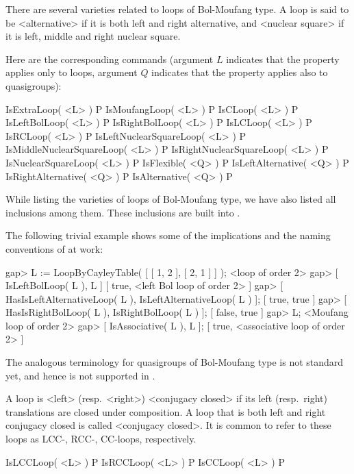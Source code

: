 There are several varieties related to loops of Bol-Moufang type. A loop is
said to be <alternative> if it is both left and
right alternative, and <nuclear square> if it is left,
middle and right nuclear square.

Here are the corresponding {\LOOPS} commands (argument $L$ indicates that the
property applies only to loops, argument $Q$ indicates that the property
applies also to quasigroups):

\>IsExtraLoop( <L> ) P
\>IsMoufangLoop( <L> ) P
\>IsCLoop( <L> ) P
\>IsLeftBolLoop( <L> ) P
\>IsRightBolLoop( <L> ) P
\>IsLCLoop( <L> ) P
\>IsRCLoop( <L> ) P
\>IsLeftNuclearSquareLoop( <L> ) P
\>IsMiddleNuclearSquareLoop( <L> ) P
\>IsRightNuclearSquareLoop( <L> ) P
\>IsNuclearSquareLoop( <L> ) P
\>IsFlexible( <Q> ) P
\>IsLeftAlternative( <Q> ) P
\>IsRightAlternative( <Q> ) P
\>IsAlternative( <Q> ) P

While listing the varieties of loops of Bol-Moufang type, we have also listed
all inclusions among them. These inclusions are built into {\LOOPS}.

The following trivial example shows some of the implications and the naming
conventions of {\LOOPS} at work:

\beginexample
gap> L := LoopByCayleyTable( [ [ 1, 2 ], [ 2, 1 ] ] );
<loop of order 2>
gap> [ IsLeftBolLoop( L ), L ]
[ true, <left Bol loop of order 2> ]
gap> [ HasIsLeftAlternativeLoop( L ), IsLeftAlternativeLoop( L ) ];
[ true, true ]
gap> [ HasIsRightBolLoop( L ), IsRightBolLoop( L ) ];
[ false, true ]
gap> L;
<Moufang loop of order 2>
gap> [ IsAssociative( L ), L ];
[ true, <associative loop of order 2> ]
\endexample

The analogous terminology for quasigroups of Bol-Moufang type is not
standard yet, and hence is not supported in {\LOOPS}.



\noindent A loop is <left> (resp.\ <right>) <conjugacy
closed> if
its left (resp.\ right) translations are closed under composition. A loop that
is both left and right conjugacy closed is called <conjugacy
closed>. It is common to refer to these loops as
LCC-, RCC-, CC-loops, respectively.

\>IsLCCLoop( <L> ) P
\>IsRCCLoop( <L> ) P
\>IsCCLoop( <L> ) P


